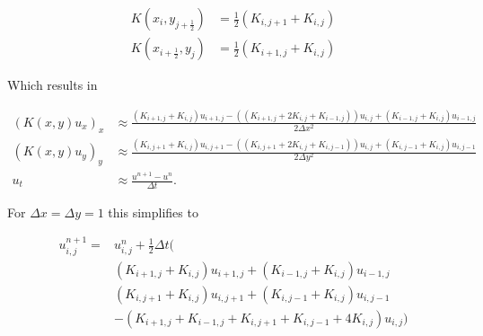 \documentclass[11pt,a4paper,noindent]{article}
\begin{document}
\begin{align}
K(x_{i},y_{j+\frac{1}{2}}) &= \frac{1}{2} (K_{i,j+1}+K_{i,j}) \\
K(x_{i+\frac{1}{2}},y_{j}) &= \frac{1}{2} (K_{i+1,j}+K_{i,j})
\end{align}

Which results in 

\begin{align}
(K(x,y) u_x)_x &\approx \frac{ (K_{i+1,j}+K_{i,j}) u_{i+1,j} - 
			    ( (K_{i+1,j}+2K_{i,j}+K_{i-1,j}))u_{i,j} + 								 (K_{i-1,j}+K_{i,j}) u_{i-1,j} }{2\Delta x^2} \\
(K(x,y) u_y)_y &\approx \frac{ (K_{i,j+1}+K_{i,j}) u_{i,j+1} - 
			    ( (K_{i,j+1}+2K_{i,j}+K_{i,j-1}))u_{i,j} + 								 (K_{i,j-1}+K_{i,j}) u_{i,j-1} }{2\Delta y^2} \\
u_t &\approx \frac{u^{n+1} - u^n}{\Delta t}.
\end{align}

For $\Delta x = \Delta y = 1$ this simplifies to

\begin{align}
u^{n+1}_{i,j} = &u^{n}_{i,j} + \frac{1}{2}\Delta t (\\
& (K_{i+1,j}+K_{i,j}) u_{i+1,j}  + (K_{i-1,j}+K_{i,j}) u_{i-1,j} \\
& (K_{i,j+1}+K_{i,j}) u_{i,j+1}  + (K_{i,j-1}+K_{i,j}) u_{i,j-1} \\
& - (K_{i+1,j}+K_{i-1,j}+K_{i,j+1}+K_{i,j-1}+4K_{i,j} )u_{i,j})
\end{align}
\end{document}

